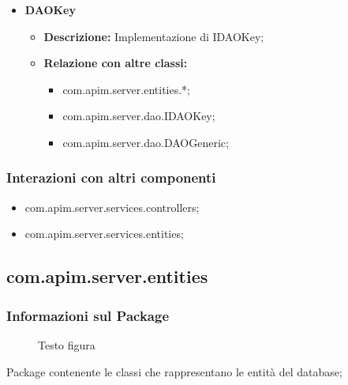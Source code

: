 {{{{{\begin{itemize}
\begin{itemize}
            \begin{itemize}
              \item com.apim.server.dao.DAOFactory;
            \end{itemize}
          \end{itemize}
          \item \textbf{DAOKey}
          \begin{itemize}
            \item \textbf{Descrizione:} Implementazione di IDAOKey;
            \item \textbf{Relazione con altre classi:}
            \begin{itemize}
              \item com.apim.server.entities.*;
              \item com.apim.server.dao.IDAOKey;
              \item com.apim.server.dao.DAOGeneric;
            \end{itemize}
          \end{itemize}
       \end{itemize}
       \subsubsection{Interazioni con altri componenti}
          \begin{itemize}
            \item com.apim.server.services.controllers;
            \item com.apim.server.services.entities;
          \end{itemize}
          
          
          \subsection{com.apim.server.entities}{
    \subsubsection{Informazioni sul Package}
        \begin{figure}[ht]
          \centering
          \caption{Testo figura}
          \label{Testo figura}
        \end{figure}
       Package contenente le classi che rappresentano le entità del database;
}}}}}}
